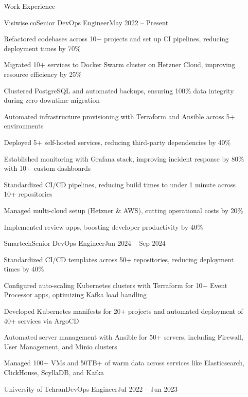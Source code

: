 \documentclass[]{main}
\begin{document}
\newpage

\begin{section}{Work Experience}
 \begin{subsection}{Visiwise.co}{Senior DevOps Engineer}{May 2022 -- Present}{}
     \item Refactored codebases across 10+ projects and set up CI pipelines, reducing deployment times by 70\%
     \item Migrated 10+ services to Docker Swarm cluster on Hetzner Cloud, improving resource efficiency by 25\%
     \item Clustered PostgreSQL and automated backups, ensuring 100\% data integrity during zero-downtime migration
     \item Automated infrastructure provisioning with Terraform and Ansible across 5+ environments
     \item Deployed 5+ self-hosted services, reducing third-party dependencies by 40\%
     \item Established monitoring with Grafana stack, improving incident response by 80\% with 10+ custom dashboards
     \item Standardized CI/CD pipelines, reducing build times to under 1 minute across 10+ repositories
     \item Managed multi-cloud setup (Hetzner \& AWS), cutting operational costs by 20\%
     \item Implemented review apps, boosting developer productivity by 40\%
 \end{subsection}
 \begin{subsection}{Smartech}{Senior DevOps Engineer}{Jan 2024 -- Sep 2024}{}
     \item Standardized CI/CD templates across 50+ repositories, reducing deployment times by 40\%
     \item Configured auto-scaling Kubernetes clusters with Terraform for 10+ Event Processor apps, optimizing Kafka load handling
     \item Developed Kubernetes manifests for 20+ projects and automated deployment of 40+ services via ArgoCD
     \item Automated server management with Ansible for 50+ servers, including Firewall, User Management, and Minio clusters
     \item Managed 100+ VMs and 50TB+ of warm data across services like Elasticsearch, ClickHouse, ScyllaDB, and Kafka
 \end{subsection}
 \begin{subsection}{University of Tehran}{DevOps Engineer}{Jul 2022 -- Jun 2023}{}

\end{subsection}
\end{section}
\end{document}
